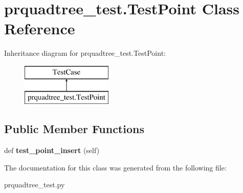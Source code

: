 \hypertarget{classprquadtree__test_1_1TestPoint}{}\section{prquadtree\+\_\+test.\+Test\+Point Class Reference}
\label{classprquadtree__test_1_1TestPoint}
Inheritance diagram for prquadtree\+\_\+test.\+Test\+Point\+:\begin{figure}[H]
\begin{center}
\leavevmode
\includegraphics[height=2.000000cm]{classprquadtree__test_1_1TestPoint}
\end{center}
\end{figure}
\subsection*{Public Member Functions}
\begin{DoxyCompactItemize}
\item 
\hypertarget{classprquadtree__test_1_1TestPoint_a4d4ae74aeca57075dc73ceb7ca894077}{}def {\bfseries test\+\_\+point\+\_\+insert} (self)\label{classprquadtree__test_1_1TestPoint_a4d4ae74aeca57075dc73ceb7ca894077}

\end{DoxyCompactItemize}


The documentation for this class was generated from the following file\+:\begin{DoxyCompactItemize}
\item 
prquadtree\+\_\+test.\+py\end{DoxyCompactItemize}
